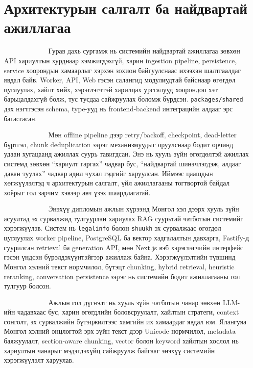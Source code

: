 \documentclass[12pt,A4]{report}
\begin{document}
\section{Архитектурын салгалт ба найдвартай ажиллагаа}

\ \ \ \ \ \ \ \ \  \ \ \ \ Гурав дахь сургамж нь системийн найдвартай ажиллагаа зөвхөн API хариултын хурднаар хэмжигдэхгүй, харин ingestion pipeline, persistence, service хоорондын хамаарлыг хэрхэн зохион байгуулснаас ихээхэн шалтгаалдаг явдал байв. Worker, API, Web гэсэн салангид модулиудтай байснаар өгөгдөл цуглуулах, хайлт хийх, хэрэглэгчтэй харилцах урсгалууд хоорондоо хэт барьцалдахгүй болж, тус тусдаа сайжруулах боломж бүрдсэн. \texttt{packages/shared} дэх нэгтгэсэн schema, type-ууд нь frontend-backend интеграцийн алдааг эрс багасгасан.

\ \ \ \ \ \ \ \ \  \ \ \ \ Мөн offline pipeline дээр retry/backoff, checkpoint, dead-letter бүртгэл, chunk deduplication зэрэг механизмуудыг оруулснаар бодит орчинд удаан хугацаанд ажиллах суурь тавигдсан. Энэ нь хууль зүйн өгөгдөлтэй ажиллах системд зөвхөн ``хариулт гаргах'' чадвар бус, ``найдвартай шинэчлэгдэж, алдааг даван туулах'' чадвар адил чухал гэдгийг харуулсан. Иймээс цаашдын хөгжүүлэлтэд ч архитектурын салгалт, үйл ажиллагааны тогтвортой байдал хоёрыг гол зарчим хэвээр авч үзэх шаардлагатай.

\ \ \ \ \ \ \ \ \  \ \ \ \ Энэхүү дипломын ажлын хүрээнд Монгол хэл дээрх хууль зүйн асуултад эх сурвалжид тулгуурлан хариулах RAG суурьтай чатботын системийг хэрэгжүүлэв. Систем нь \texttt{legalinfo} болон \texttt{shuukh} эх сурвалжаас өгөгдөл цуглуулах worker pipeline, PostgreSQL ба вектор хадгалалтын давхарга, Fastify-д суурилсан retrieval ба generation API, мөн Next.js вэб хэрэглэгчийн интерфейс гэсэн үндсэн бүрэлдэхүүнтэйгээр ажиллаж байна. Хэрэгжүүлэлтийн түвшинд Монгол хэлний текст нормчилол, бүтэцт chunking, hybrid retrieval, heuristic reranking, conversation persistence зэрэг нь системийн бодит ажиллагааны гол тулгуур болсон.

\ \ \ \ \ \ \ \ \  \ \ \ \ Ажлын гол дүгнэлт нь хууль зүйн чатботын чанар зөвхөн LLM-ийн чадавхаас бус, харин өгөгдлийн боловсруулалт, хайлтын стратеги, context сонголт, эх сурвалжийн бүтэцжилтээс хамгийн их хамаардаг явдал юм. Ялангуяа Монгол хэлний онцлогтой эрх зүйн текст дээр Unicode нормчилол, metadata баяжуулалт, section-aware chunking, vector болон keyword хайлтын хослол нь хариултын чанарыг мэдэгдэхүйц сайжруулж байгааг энэхүү системийн хэрэгжүүлэлт харуулав.
\end{document}
